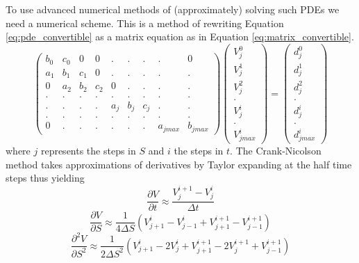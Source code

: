 \documentclass{article}
\begin{document}
To use advanced numerical methods of (approximately) solving such PDEs we need a numerical scheme. This is a method of rewriting Equation \ref{eq:pde_convertible} as a matrix equation as in Equation \ref{eq:matrix_convertible}.
\begin{equation}
\begin{pmatrix}
b_0 & c_0 & 0 & 0 & . & . & . & . & 0\\[6pt]
a_1 & b_1 & c_1 & 0 & . & . & . & . & .\\[6pt]
0 & a_2 & b_2 & c_2 & 0 & . & . & . & .\\[6pt]
. & . & . & . & . & . & . & . & .\\[6pt]
. & . & . & . & a_j & b_j & c_j & . & .\\[6pt]
. & . & . & . & . & . & . & . & .\\[6pt]
0 & . & . & . & . & . & . & a_{jmax} & b_{jmax}
\end{pmatrix}
\begin{pmatrix}
{V_j^0}\\[6pt]
{V_j^1}\\[6pt]
{V_j^2}\\[6pt]
.\\[6pt]
{V_j^i}\\[6pt]
.\\[6pt]
{V_{jmax}^i}
\end{pmatrix}
=
\begin{pmatrix}
{d_j^0}\\[6pt]
{d_j^1}\\[6pt]
{d_j^2}\\[6pt]
.\\[6pt]
{d_j^i}\\[6pt]
.\\[6pt]
{d_{jmax}^i}
\end{pmatrix}
  \label{eq:matrix_convertible}
\end{equation}
where $j$ represents the steps in $S$ and $i$ the steps in $t$. The Crank-Nicolson method takes approximations of derivatives by Taylor expanding at the half time steps thus yielding
\begin{equation}
  \frac{\partial V}{\partial t} \approx \frac{V_j^{i+1}-{V_j^i}}{\Delta t}
  \label{eq:dvdt}
\end{equation}
\begin{equation}
  \frac{\partial V}{\partial S} \approx \frac{1}{4 \Delta S}(V_{j+1}^{i}-{V_{j-1}^i}+V_{j+1}^{i+1}-V_{j-1}^{i+1})
  \label{eq:dvds}
\end{equation}
\begin{equation}
  \frac{\partial^2 V}{\partial S^2} \approx \frac{1}{2 \Delta S^2}(V_{j+1}^{i}-2{V_{j}^i}+V_{j+1}^{i+1}-2V_{j}^{i+1}+V_{j-1}^{i+1})
  \label{eq:d2vds2}
\end{equation}
\end{document}
